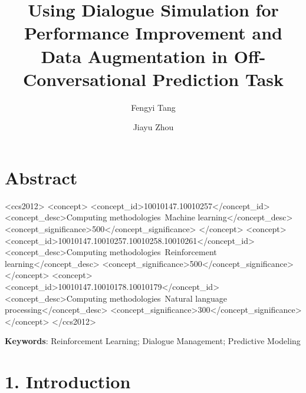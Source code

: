 

\title{Using Dialogue Simulation for Performance Improvement and Data Augmentation in Off-Conversational Prediction Task}

\author{Fengyi Tang}

\author{Jiayu Zhou}

\section{Abstract}


\begin{CCSXML}
<ccs2012>
<concept>
<concept_id>10010147.10010257</concept_id>
<concept_desc>Computing methodologies~Machine learning</concept_desc>
<concept_significance>500</concept_significance>
</concept>
<concept>
<concept_id>10010147.10010257.10010258.10010261</concept_id>
<concept_desc>Computing methodologies~Reinforcement learning</concept_desc>
<concept_significance>500</concept_significance>
</concept>
<concept>
<concept_id>10010147.10010178.10010179</concept_id>
<concept_desc>Computing methodologies~Natural language processing</concept_desc>
<concept_significance>300</concept_significance>
</concept>
</ccs2012>
\end{CCSXML}


\textbf{Keywords}: Reinforcement Learning; Dialogue Management; Predictive Modeling 

\maketitle

\section{1. Introduction}



